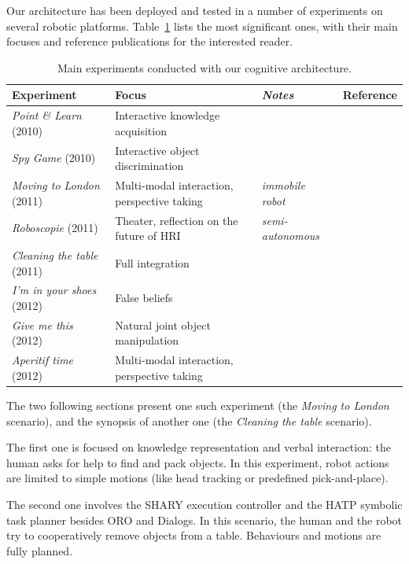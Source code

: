 \documentclass[preprint,3p,times]{elsarticle}
\begin{document}
Our architecture has been deployed and tested in a number of experiments on
several robotic platforms. Table~\ref{table|experiences} lists the most
significant ones, with their main focuses and reference publications for the
interested reader.

\begin{table}
\begin{center}

\begin{tabular}{llll}
 \bf{Experiment} & Focus & \emph{Notes} & Reference \\
\hline
{\it Point \& Learn} (2010) & Interactive knowledge acquisition & & \cite{Lemaignan2010} \\
{\it Spy Game} (2010) & Interactive object discrimination & & \cite{Ros2010b} \\
{\it Moving to London} (2011) & Multi-modal interaction, perspective taking & \emph{immobile robot} & \cite{lemaignan2011what} \\
{\it Roboscopie} (2011) & Theater, reflection on the future of HRI & \emph{semi-autonomous} & \cite{lemaignan2012roboscopie} \\
{\it Cleaning the table} (2011) & Full integration & & \cite{Alami2011} \\
{\it I'm in your shoes} (2012) & False beliefs & & \cite{warnier2012when} \\
{\it Give me this} (2012) & Natural joint object manipulation & & \cite{gharbi2013natural} \\
{\it Aperitif time} (2012) & Multi-modal interaction, perspective taking & & \cite{lemaignan2013talking} \\
\hline

\end{tabular}
\end{center}
\caption{Main experiments conducted with our cognitive architecture.}
\label{table|experiences}
\end{table}

The two following sections present one such experiment (the {\it Moving to
London} scenario), and the synopsis of another one (the {\it Cleaning the
table} scenario).

The first one is focused on knowledge representation and verbal interaction:
the human asks for help to find and pack objects. In this experiment, robot
actions are limited to simple motions (like head tracking or predefined
pick-and-place).

The second one involves the SHARY execution controller and the HATP symbolic
task planner besides ORO and {\sc Dialogs}. In this scenario, the human and the
robot try to cooperatively remove objects from a table. Behaviours and motions
are fully planned.
\end{document}
